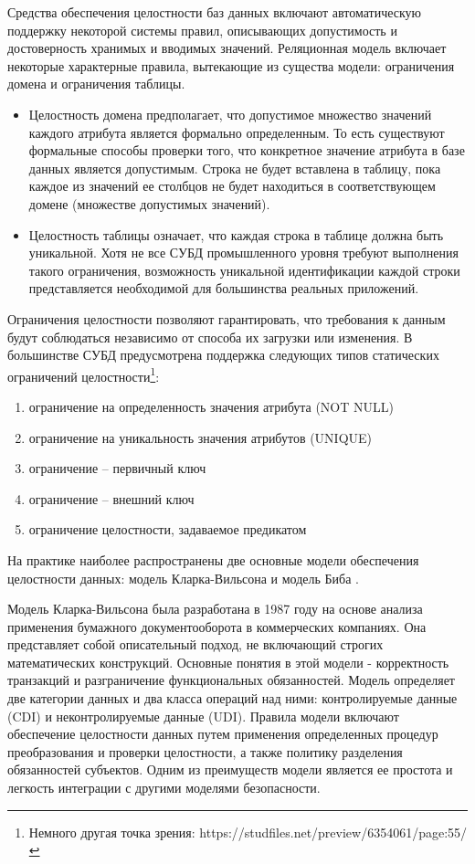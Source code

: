 Средства обеспечения целостности баз данных включают автоматическую поддержку некоторой системы правил, описывающих допустимость и достоверность хранимых и вводимых значений. Реляционная модель включает некоторые характерные правила, вытекающие из существа модели: ограничения домена и ограничения таблицы.
\begin{itemize}
	\item Целостность домена предполагает, что допустимое множество значений каждого атрибута является формально определенным. То есть существуют формальные способы проверки того, что конкретное значение атрибута в базе данных является допустимым. Строка не будет вставлена в таблицу, пока каждое из значений ее столбцов не будет находиться в соответствующем домене (множестве допустимых значений).
	\item Целостность таблицы означает, что каждая строка в таблице	должна быть уникальной. Хотя не все СУБД промышленного уровня требуют выполнения такого ограничения, возможность уникальной идентификации каждой строки представляется необходимой для большинства реальных приложений.
\end{itemize}

Ограничения целостности позволяют гарантировать, что требования к данным будут соблюдаться независимо от способа их загрузки или изменения. В большинстве СУБД предусмотрена поддержка следующих типов статических ограничений целостности\footnote{Немного другая точка зрения: https://studfiles.net/preview/6354061/page:55/}:
\begin{enumerate}
	\item ограничение на определенность значения атрибута (NOT NULL)
	\item ограничение на уникальность значения атрибутов (UNIQUE)
	\item ограничение -- первичный ключ
	\item ограничение -- внешний ключ
	\item ограничение целостности, задаваемое предикатом
\end{enumerate}

На практике наиболее распространены две основные модели обеспечения целостности данных: модель Кларка-Вильсона и модель Биба \autocite[сс. 60-62]{Skakun}.

Модель Кларка-Вильсона была разработана в 1987 году на основе анализа применения бумажного документооборота в коммерческих компаниях. Она представляет собой описательный подход, не включающий строгих математических конструкций. Основные понятия в этой модели - корректность транзакций и разграничение функциональных обязанностей. Модель определяет две категории данных и два класса операций над ними: контролируемые данные (CDI) и неконтролируемые данные (UDI). Правила модели включают обеспечение целостности данных путем применения определенных процедур преобразования и проверки целостности, а также политику разделения обязанностей субъектов. Одним из преимуществ модели является ее простота и легкость интеграции с другими моделями безопасности.


